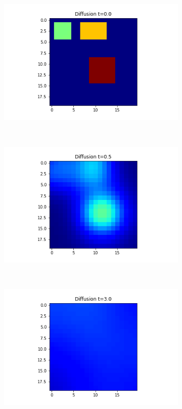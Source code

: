 \documentclass[10pt,a4paper]{article}
\begin{document}
\begin{figure}[!h]
	\centering
	\begin{subfigure}[b]{0.25\textwidth}
		\includegraphics[width=\textwidth]{images/grid-t0-x01.png}
	\end{subfigure}~
	\begin{subfigure}[b]{0.25\textwidth}
		\includegraphics[width= \textwidth]{images/grid-t05-x01.png}
	\end{subfigure}~
	\begin{subfigure}[b]{0.25\textwidth}
		\includegraphics[width= \textwidth]{images/grid-t3-x01.png}

\end{subfigure}
\end{figure}
\end{document}
